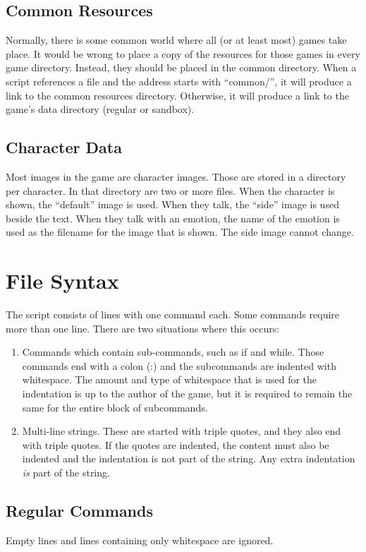 \documentclass{article}
\begin{document}
\subsection{Common Resources}
Normally, there is some common world where all (or at least most) games take
place. It would be wrong to place a copy of the resources for those games in
every game directory. Instead, they should be placed in the common directory.
When a script references a file and the address starts with ``common/'', it
will produce a link to the common resources directory. Otherwise, it will
produce a link to the game's data directory (regular or sandbox).

\subsection{Character Data}
Most images in the game are character images. Those are stored in a directory
per character. In that directory are two or more files. When the character is
shown, the ``default'' image is used. When they talk, the ``side'' image is
used beside the text. When they talk with an emotion, the name of the emotion
is used as the filename for the image that is shown. The side image cannot
change.

\section{File Syntax}
The script consists of lines with one command each. Some commands require more
than one line. There are two situations where this occurs:
\begin{enumerate}
	\item Commands which contain sub-commands, such as if and while. Those
		commands end with a colon (:) and the subcommands are indented
		with whitespace. The amount and type of whitespace that is used
		for the indentation is up to the author of the game, but it is
		required to remain the same for the entire block of
		subcommands.

	\item Multi-line strings. These are started with triple quotes, and
		they also end with triple quotes. If the quotes are indented,
		the content must also be indented and the indentation is not
		part of the string. Any extra indentation \textit{is} part of
		the string.
\end{enumerate}

\subsection{Regular Commands}
Empty lines and lines containing only whitespace are ignored.
\end{document}
